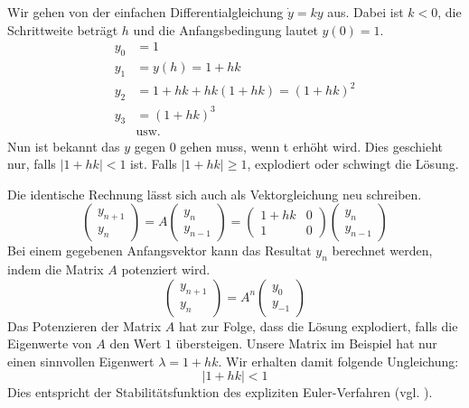 Wir gehen von der einfachen Differentialgleichung $\dot{y}=ky$ aus.
Dabei ist $k < 0$, die Schrittweite beträgt $h$ und die Anfangsbedingung lautet $y(0) = 1$.
\begin{align}
	y_0 &= 1\\
	y_1 &= y(h) = 1 + hk\\
	y_2 &= 1 + hk + hk(1+hk) = (1+hk)^2\\
	y_3 &= (1+hk)^3\\
	&\text{usw.} \nonumber
\end{align} 
Nun ist bekannt das $y$ gegen $0$ gehen muss, wenn t erhöht wird.
Dies geschieht nur, falls $\vert 1+hk \vert < 1$ ist.
Falls $\vert 1+hk \vert \ge 1$, explodiert oder schwingt die Lösung.

Die identische Rechnung lässt sich auch als Vektorgleichung neu schreiben.
\begin{equation}
	\left( \begin{array}{c}y_{n+1} \\ y_n \end{array} \right) = A \left( \begin{array}{c}y_n \\ y_{n-1} \end{array} \right) = \begin{pmatrix} 
	1+hk & 0 \\
	1 & 0
	\end{pmatrix}\left( \begin{array}{c}y_n \\ y_{n-1} \end{array} \right)
\end{equation}
Bei einem gegebenen Anfangsvektor kann das Resultat $y_n$ berechnet werden, indem die Matrix $A$ potenziert wird.
\begin{equation}
\left( \begin{array}{c}y_{n+1} \\ y_n \end{array} \right) = A^n \left( \begin{array}{c}y_0 \\ y_{-1} \end{array} \right)
\end{equation}
Das Potenzieren der Matrix $A$ hat zur Folge, dass die Lösung explodiert, falls die Eigenwerte von $A$ den Wert $1$ übersteigen.
Unsere Matrix im Beispiel hat nur einen sinnvollen Eigenwert $\lambda = 1+hk$.
Wir erhalten damit folgende Ungleichung:
\begin{equation}
	\vert 1+hk \vert < 1
\end{equation}
Dies entspricht der Stabilitätsfunktion des expliziten Euler-Verfahren (vgl. \cite{verzoegert:euler}).


